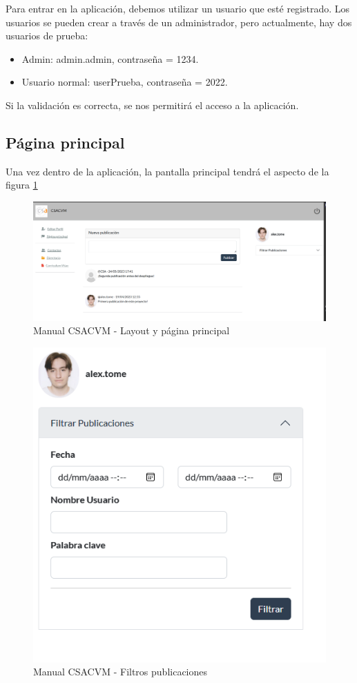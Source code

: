 Para entrar en la aplicación, debemos utilizar un usuario que esté registrado. Los usuarios se pueden crear a través de un administrador, pero actualmente, hay dos usuarios de prueba:
\begin{itemize}
    \tightlist
    \item Admin: admin.admin, contraseña = 1234.
    \item Usuario normal: userPrueba, contraseña = 2022.
\end{itemize}

Si la validación es correcta, se nos permitirá el acceso a la aplicación. 

\subsection{Página principal}
Una vez dentro de la aplicación, la pantalla principal tendrá el aspecto de la figura \ref{manualIndex}

\begin{figure}
    \centering
    \includegraphics[width=\linewidth]{img/ManualUsuario/Manual02.png}
    \caption{Manual CSACVM - Layout y página principal} 
    \label{manualIndex}
\end{figure}

\begin{figure}
    \centering
    \includegraphics[width=.9\linewidth]{img/ManualUsuario/Manual03.png}
    \caption{Manual CSACVM - Filtros publicaciones} 
\end{figure}

